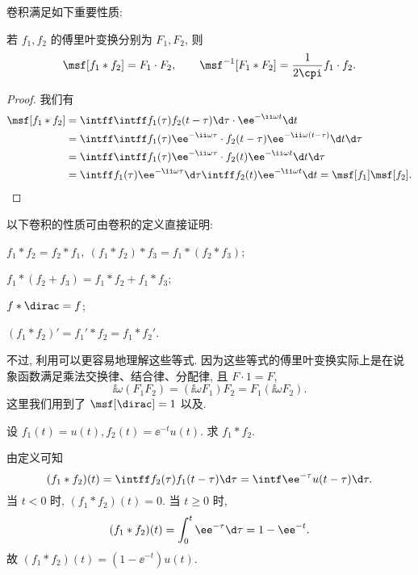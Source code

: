 卷积满足如下重要性质:

\begin{theorem}[卷积定理]\label{thm:convolution-theorem}
  若 $f_1,f_2$ 的傅里叶变换分别为 $F_1,F_2$, 则
  \[
    \msf[f_1\ast f_2]=F_1\cdot F_2,\qquad
    \msf^{-1}[F_1\ast F_2]=\frac1{2\cpi}f_1\cdot f_2.
  \]
\end{theorem}

\begin{proof}
  我们有
  \begin{align*}
    \msf[f_1\ast f_2]&=\intff \intff f_1(\tau)f_2(t-\tau)\d \tau \cdot \ee^{-\ii \omega t}\d t\\
    &=\intff \intff f_1(\tau)\ee^{-\ii \omega \tau}\cdot f_2(t-\tau)\ee^{-\ii \omega (t-\tau)}\d t\d \tau\\
    &=\intff \intff f_1(\tau)\ee^{-\ii \omega \tau}\cdot f_2(t)\ee^{-\ii \omega t}\d t\d \tau\\
    &=\intff f_1(\tau)\ee^{-\ii \omega \tau}\d\tau\intff f_2(t)\ee^{-\ii \omega t}\d t
    =\msf[f_1]\msf[f_2].
  \end{align*}
\end{proof}

以下卷积的性质可由卷积的定义直接证明:
\begin{enuma}
  \item $f_1\ast f_2=f_2\ast f_1,\ (f_1\ast f_2)\ast f_3=f_1\ast(f_2\ast f_3)$;
  \item $f_1\ast(f_2+f_3)=f_1\ast f_2+f_1\ast f_3$;
  \item $f\ast\dirac=f$;
  \item $(f_1\ast f_2)'=f_1'\ast f_2=f_1\ast f_2'$.
\end{enuma}\par\noindent
不过, 利用\thmFConv 可以更容易地理解这些等式.
因为这些等式的傅里叶变换实际上是在说象函数满足乘法交换律、结合律、分配律, 且 $F\cdot 1=F$,
\[
  \ii\omega (F_1F_2)=(\ii\omega F_1)F_2
  =F_1(\ii\omega F_2).
\]
这里我们用到了 $\msf[\dirac]=1$ 以及\thmFDif.

\begin{example}
  设 $f_1(t)=u(t),f_2(t)=\ee^{-t}u(t)$. 求 $f_1\ast f_2$.
\end{example}

\begin{solution}
  由定义可知
  \[
     (f_1\ast f_2)(t)
    =\intff f_2(\tau)f_1(t-\tau)\d \tau
    =\intf \ee^{-\tau}u(t-\tau)\d \tau.
  \]
  当 $t<0$ 时, $(f_1\ast f_2)(t)=0$.
  当 $t\ge0$ 时, 
  \[
     (f_1\ast f_2)(t)
    =\int_0^t \ee^{-\tau}\d \tau
    =1-\ee^{-t}.
  \]
  故 $(f_1\ast f_2)(t)=(1-\ee^{-t})u(t)$.
\end{solution}

